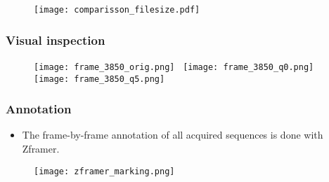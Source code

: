 \documentclass{beamer}
\begin{document}


		 \begin{frame}%
			\begin{figure}
				\texttt{[image: comparisson\_filesize.pdf]}
			 \end{figure}
		 \end{frame}


		 \begin{frame}\frametitle{Visual inspection}
			\begin{figure}[htb!]
				\centering
				\texttt{[image: frame\_3850\_orig.png]}~
				\texttt{[image: frame\_3850\_q0.png]}\\
				\vspace{.5mm}
				\texttt{[image: frame\_3850\_q5.png]}
				\label{fig:compression_vis}
			\end{figure}
		\end{frame}


		\begin{frame}\frametitle{Annotation}
			\begin{itemize}
				\item The frame-by-frame annotation of all acquired sequences is done with Zframer.
			\end{itemize}
			\begin{figure}[htb]
				\centering
				\texttt{[image: zframer\_marking.png]}
				\label{fig:zframer1}
			\end{figure}
		\end{frame}
\end{document}
